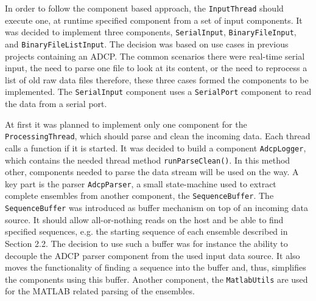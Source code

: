 In order to follow the component based approach, the \texttt{InputThread} should execute one, at runtime specified component from a set of input components. It was decided to implement three components, \texttt{SerialInput}, \texttt{BinaryFileInput}, and \texttt{BinaryFileListInput}. The decision was based on use cases in previous projects containing an ADCP. The common scenarios there were real-time serial input, the need to parse one file to look at its content, or the need to reprocess a list of old raw data files therefore, these three cases formed the components to be implemented. The \texttt{SerialInput} component uses a \texttt{SerialPort} component to read the data from a serial port. 

At first it was planned to implement only one component for the \texttt{ProcessingThread}, which should parse and clean the incoming data. Each thread calls a function if it is started. It was decided to build a component \texttt{AdcpLogger}, which contains the needed thread method \texttt{runParseClean()}. In this method other, components needed to parse the data stream will be used on the way. A key part is the parser \texttt{AdcpParser}, a small state-machine used to extract complete ensembles from another component, the \texttt{SequenceBuffer}. The \texttt{SequenceBuffer} was introduced as buffer mechanism on top of an incoming data source. It should allow all-or-nothing reads on the host and be able to find specified sequences, e.g. the starting sequence of each ensemble described in Section 2.2. The decision to use such a buffer was for instance the ability to decouple the ADCP parser component from the used input data source. It also moves the functionality of finding a sequence into the buffer and, thus, simplifies the components using this buffer. Another component, the \texttt{MatlabUtils} are used for the MATLAB related parsing of the ensembles.


